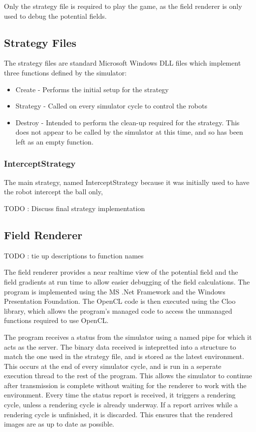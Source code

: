 \documentclass[10pt]{article} \usepackage[a4paper]{geometry}
\begin{document}
Only the strategy file is required to play the game, as the field renderer is
only used to debug the potential fields.

\subsection{Strategy Files}

The strategy files are standard Microsoft Windows \ac{DLL} files which
implement three functions defined by the simulator:
\begin{itemize}
\item Create - Performs the initial setup for the strategy
\item Strategy - Called on every simulator cycle to control the robots
\item Destroy - Intended to perform the clean-up required for the strategy.
This does not appear to be called by the simulator at this time, and so has been
 left as an empty function.
\end{itemize}

\subsubsection{InterceptStrategy}

The main strategy, named InterceptStrategy because it was initially used to have
the robot intercept the ball only,

TODO : Discuss final strategy implementation

\subsection{Field Renderer}

TODO : tie up descriptions to function names

The field renderer provides a near realtime view of the potential field and the
field gradients at run time to allow easier debugging of the field calculations.
The program is implemented using the MS .Net Framework and the Windows
Presentation Foundation. The OpenCL code is then executed using the Cloo
library, which allows the program's managed code to access the unmanaged
functions required to use OpenCL.

The program receives a status from the simulator using a named pipe for which it
acts as the server. The binary data received is intepretted into a structure to
match the one used in the strategy file, and is stored as the latest
environment. This occurs at the end of every simulator cycle, and is run in a
seperate execution thread to the rest of the program. This allows the simulator
to continue after transmission is complete without waiting for the renderer to
work with the environment. Every time the status report is received, it triggers
a rendering cycle, unless a rendering cycle is already underway. If a report
arrives while a rendering cycle is unfinished, it is discarded. This ensures
that the rendered images are as up to date as possible.
\end{document}
